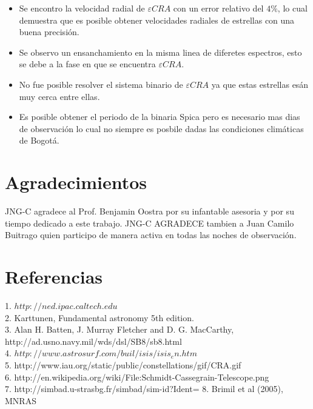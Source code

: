 \documentclass[Proceedings]{ascelike}
\begin{document}
\begin{itemize}
\item Se encontro la velocidad radial de $\varepsilon CRA$ con un error relativo del $4\%$, lo cual demuestra que es posible obtener velocidades radiales de estrellas con una buena precisi\'on.

\item Se observo un ensanchamiento en la misma linea de diferetes espectros, esto se debe a la fase en que se encuentra $\varepsilon CRA$.

\item No fue posible resolver el sistema binario de $\varepsilon CRA$ ya que estas estrellas es\'an muy cerca entre ellas. 

\item Es posible obtener el periodo de la binaria Spica pero es necesario mas dias de observaci\'on lo cual no siempre es posbile dadas las condiciones clim\'aticas de Bogot\'a.  
\end{itemize}

\section{Agradecimientos}

JNG-C agradece al Prof. Benjamin Oostra por su infantable asesoria y por su tiempo dedicado a este trabajo. JNG-C AGRADECE tambien a Juan Camilo Buitrago quien participo de manera activa en todas las noches de observaci\'on.  

\section{Referencias}

1. $http://ned.ipac.caltech.edu$  \\
2. Karttunen, Fundamental astronomy 5th edition.\\
3. Alan H. Batten, J. Murray Fletcher and D. G. MacCarthy, http://ad.usno.navy.mil/wds/dsl/SB8/sb8.html\\
4. $http://www.astrosurf.com/buil/isis/isis_en.htm$\\
5. http://www.iau.org/static/public/constellations/gif/CRA.gif \\
6. http://en.wikipedia.org/wiki/File:Schmidt-Cassegrain-Telescope.png \\
7. http://simbad.u-strasbg.fr/simbad/sim-id?Ident=%
8. Brimil et al (2005), MNRAS
\end{document}
